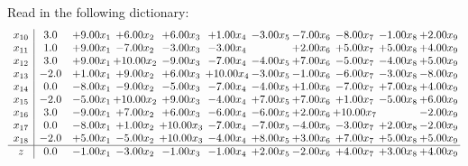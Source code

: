\documentclass[9pt]{article}
\begin{document}
Read in the following dictionary:
\[\begin{array}{c| c c@{\hskip 2pt} c@{\hskip 2pt} c@{\hskip 2pt} c@{\hskip 2pt} c@{\hskip 2pt} c@{\hskip 2pt} c@{\hskip 2pt} c@{\hskip 2pt} c@{\hskip 2pt} }
 x_{10}   &  3.0 & +  9.00 x_{1} & +  6.00 x_{2} & +  6.00 x_{3} & +  1.00 x_{4} & -3.00 x_{5} & -7.00 x_{6} & -8.00 x_{7} & -1.00 x_{8} & +  2.00 x_{9}\\
 x_{11}   &  1.0 & +  9.00 x_{1} & -7.00 x_{2} & -3.00 x_{3} & -3.00 x_{4} &   & +  2.00 x_{6} & +  5.00 x_{7} & +  5.00 x_{8} & +  4.00 x_{9}\\
 x_{12}   &  3.0 & +  9.00 x_{1} & + 10.00 x_{2} & -9.00 x_{3} & -7.00 x_{4} & -4.00 x_{5} & +  7.00 x_{6} & -5.00 x_{7} & -4.00 x_{8} & +  5.00 x_{9}\\
 x_{13}   &  -2.0 & +  1.00 x_{1} & +  9.00 x_{2} & +  6.00 x_{3} & + 10.00 x_{4} & -3.00 x_{5} & -1.00 x_{6} & -6.00 x_{7} & -3.00 x_{8} & -8.00 x_{9}\\
 x_{14}   &  0.0 & -8.00 x_{1} & -9.00 x_{2} & -5.00 x_{3} & -7.00 x_{4} & -4.00 x_{5} & +  1.00 x_{6} & -7.00 x_{7} & +  7.00 x_{8} & +  4.00 x_{9}\\
 x_{15}   &  -2.0 & -5.00 x_{1} & + 10.00 x_{2} & +  9.00 x_{3} & -4.00 x_{4} & +  7.00 x_{5} & +  7.00 x_{6} & +  1.00 x_{7} & -5.00 x_{8} & +  6.00 x_{9}\\
 x_{16}   &  3.0 & -9.00 x_{1} & +  7.00 x_{2} & +  6.00 x_{3} & -6.00 x_{4} & -6.00 x_{5} & +  2.00 x_{6} & + 10.00 x_{7} &   & -2.00 x_{9}\\
 x_{17}   &  0.0 & -8.00 x_{1} & +  1.00 x_{2} & + 10.00 x_{3} & -7.00 x_{4} & -7.00 x_{5} & -4.00 x_{6} & -3.00 x_{7} & +  2.00 x_{8} & -2.00 x_{9}\\
 x_{18}   &  -2.0 & +  5.00 x_{1} & -5.00 x_{2} & + 10.00 x_{3} & -4.00 x_{4} & +  8.00 x_{5} & +  3.00 x_{6} & +  7.00 x_{7} & +  5.00 x_{8} & +  5.00 x_{9}\\
\hline
z    &  0.0 & -1.00 x_{1} & -3.00 x_{2} & -1.00 x_{3} & -1.00 x_{4} & +  2.00 x_{5} & -2.00 x_{6} & +  4.00 x_{7} & +  3.00 x_{8} & +  4.00 x_{9}\\
\end{array}\]
\end{document}
